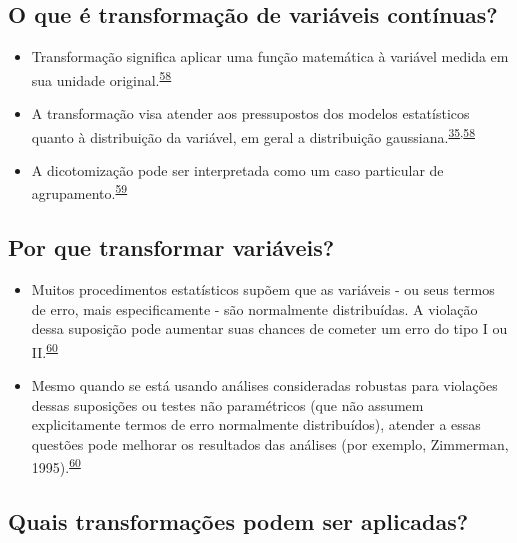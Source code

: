 \documentclass[
  a4paper,
]{book}
\begin{document}
\hypertarget{o-que-uxe9-transformauxe7uxe3o-de-variuxe1veis-contuxednuas}{%
\subsection{O que é transformação de variáveis contínuas?}\label{o-que-uxe9-transformauxe7uxe3o-de-variuxe1veis-contuxednuas}}

\begin{itemize}
\item
  Transformação significa aplicar uma função matemática à variável medida em sua unidade original.\textsuperscript{\protect\hyperlink{ref-Bland1996}{58}}
\item
  A transformação visa atender aos pressupostos dos modelos estatísticos quanto à distribuição da variável, em geral a distribuição gaussiana.\textsuperscript{\protect\hyperlink{ref-vetter2017}{35},\protect\hyperlink{ref-Bland1996}{58}}
\item
  A dicotomização pode ser interpretada como um caso particular de agrupamento.\textsuperscript{\protect\hyperlink{ref-Fedorov2009}{59}}
\end{itemize}

\hypertarget{por-que-transformar-variuxe1veis}{%
\subsection{Por que transformar variáveis?}\label{por-que-transformar-variuxe1veis}}

\begin{itemize}
\item
  Muitos procedimentos estatísticos supõem que as variáveis - ou seus termos de erro, mais especificamente - são normalmente distribuídas. A violação dessa suposição pode aumentar suas chances de cometer um erro do tipo I ou II.\textsuperscript{\protect\hyperlink{ref-osborne2010}{60}}
\item
  Mesmo quando se está usando análises consideradas robustas para violações dessas suposições ou testes não paramétricos (que não assumem explicitamente termos de erro normalmente distribuídos), atender a essas questões pode melhorar os resultados das análises (por exemplo, Zimmerman, 1995).\textsuperscript{\protect\hyperlink{ref-osborne2010}{60}}
\end{itemize}

\hypertarget{quais-transformauxe7uxf5es-podem-ser-aplicadas}{%
\subsection{Quais transformações podem ser aplicadas?}\label{quais-transformauxe7uxf5es-podem-ser-aplicadas}}
\end{document}
